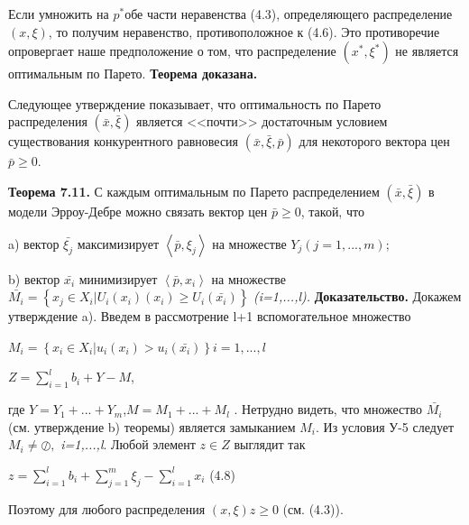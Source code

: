 \documentclass[12pt, 4paper]{book}
\begin{document}
{Если умножить на $p^{*}$обе части неравенства (4.3), определяющего распределение $(x,\xi)$, то получим неравенство, противоположное к (4.6). Это противоречие опровергает наше предположение о том, что распределение $(x^{*},\xi^{*})$ не является оптимальным по Парето. \textbf{Теорема доказана.}
\par

Следующее утверждение показывает, что оптимальность по Парето распределения $(\bar{x},\bar{\xi})$ является <<почти>> достаточным условием существования конкурентного равновесия $(\bar{x},\bar{\xi},\bar{p})$ для некоторого вектора цен $\bar{p} \geq 0$.
\par

\textbf{Теорема 7.11.} С каждым оптимальным по Парето распределением $(\bar{x},\bar{\xi})$ в модели Эрроу-Дебре можно связать вектор цен  $\bar{p} \geq 0$, такой, что 
\par

a) вектор $\bar{\xi_j}$ максимизирует $\left\langle \bar{p},\xi_j \right\rangle$ на множестве $Y_j(j=1,...,m);$
\par

b) вектор $\bar{x_i}$ минимизирует $\left\langle \bar{p},x_i \right\rangle$ на множестве \\
$\bar{M_i}=\left\{x_j \in X_i | U_i(x_i) (x_i) \geq U_i(\bar{x_{i}})\right\}$ \textit{(i=1,...,l).}
\textbf{Доказательство.} Докажем утверждение a). Введем в рассмотрение l+1 вспомогательное множество
\begin{center}
$M_i = \left\{ x_i \in X_i | u_i(x_i) > u_i(\bar{x_i})\right\} i=1,...,l$
\end{center}
\begin{center}
$Z = \sum\limits_{i=1}^{l} b_i +Y -M$,
\end{center}
где $Y=Y_1 + ... + Y_m$,$M = M_1 + ... + M_l$ . Нетрудно видеть, что множество $\bar{M_i}$ (см. утверждение b) теоремы) является замыканием  $M_i$. Из условия У-5 следует $M_i \neq \oslash ,$ \textit{i=1,...,l}.
Любой элемент $z \in Z$ выглядит так
\begin{center}
$z = \sum\limits_{i=1}^l b_i + \sum\limits_{j=1}^m \xi_j - \sum\limits_{i=1}^{l} x_i$ (4.8)
\end{center}
Поэтому для любого распределения $(x,\xi) z \geq 0$ (см. (4.3)).
\par

}
\end{document}
